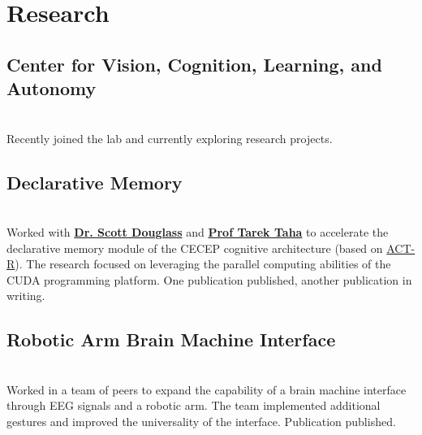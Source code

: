 \documentclass[letterpaper]{deedy-resume} %
\begin{document}
\begin{minipage}[t]{0.66\textwidth} %


\section{Research}

\subsection{Center for Vision, Cognition, Learning, and Autonomy}
 \hfill {} \\ 
\smallsectionspace
Recently joined the lab and currently exploring research projects.

\sectionspace %


\subsection{Declarative Memory}
 \hfill {} \\
\smallsectionspace %
Worked with \textbf{\href{http://act-r.psy.cmu.edu/?post_type=authors&p=10523}{Dr. Scott Douglass}} and \textbf{\href{https://www.udayton.edu/directory/engineering/electrical_and_computer/taha_tarek_m.php}{Prof Tarek Taha}} to accelerate the declarative memory module of the CECEP cognitive architecture (based on \href{http://act-r.psy.cmu.edu/}{ACT-R}). The research focused on leveraging the parallel computing abilities of the CUDA programming platform. One publication published, another publication in writing.

\sectionspace %


\subsection{Robotic Arm Brain Machine Interface}
 \hfill {} \\
\smallsectionspace %
Worked in a team of peers to expand the capability of a brain machine interface through EEG signals and a robotic arm. The team implemented additional gestures and improved the universality of the interface. Publication published.



\end{minipage}
\end{document}
